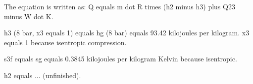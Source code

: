 The equation is written as:  
Q equals m dot R times (h2 minus h3) plus Q23 minus W dot K.  

h3 (8 bar, x3 equals 1) equals hg (8 bar) equals 93.42 kilojoules per kilogram.  
x3 equals 1 because isentropic compression.  

s3f equals sg equals 0.3845 kilojoules per kilogram Kelvin because isentropic.  

h2 equals ... (unfinished).